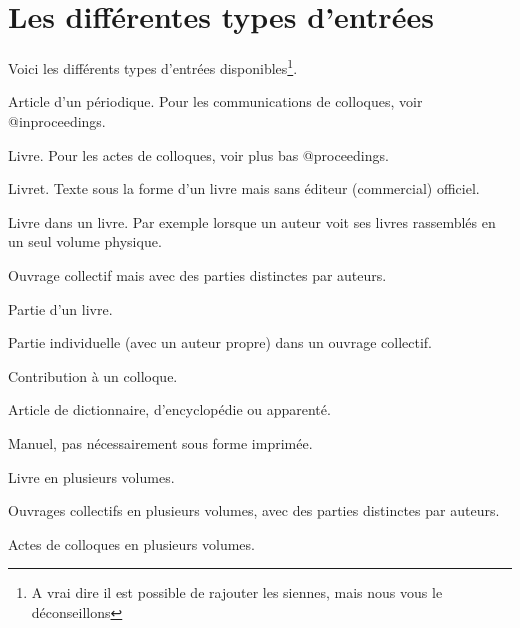 \section{Les différentes types d'entrées}
Voici les différents types d'entrées disponibles\footnote{A vrai dire il est possible de rajouter les siennes, mais nous vous le déconseillons}.


\begin{fieldlist}

Article d'un périodique. Pour les communications de colloques, voir @inproceedings.

Livre. Pour les actes de colloques, voir plus bas @proceedings. 

	
	Livret. Texte sous la forme d'un livre mais sans éditeur (commercial) officiel.
	
	
	Livre dans un livre. Par exemple lorsque un auteur  voit ses livres rassemblés en un seul volume physique. 	
	
	
	Ouvrage collectif mais avec des parties distinctes par auteurs.
	
	
	Partie d'un livre.
	
	
	Partie individuelle (avec un auteur propre) dans un ouvrage collectif.
	
	 
	 Contribution à un colloque.
	 

		 
	 
	 Article de dictionnaire, d'encyclopédie ou apparenté.
	 

	
	 Manuel, pas nécessairement sous forme imprimée.
	 
	 Livre en plusieurs volumes.
	 
	 
	 Ouvrages collectifs en plusieurs volumes, avec des parties distinctes par auteurs.
	 
	 
	 Actes de colloques en plusieurs volumes.
	 

\end{fieldlist}

